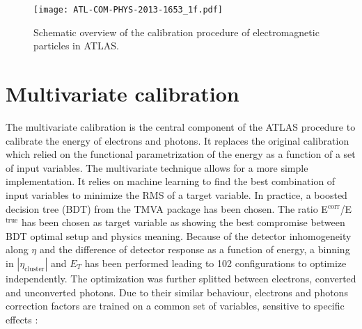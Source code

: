 \begin{figure}[htbp]
\centering
\texttt{[image: ATL-COM-PHYS-2013-1653\_1f.pdf]}
\caption{\label{fig:orgfcfa421}
Schematic overview of the calibration procedure of electromagnetic particles in ATLAS.\cite{CERN-PH-EP-2014-153}}
\end{figure}


\section{Multivariate calibration}
\label{sec:org8232c38}

The multivariate calibration \cite{CERN-PH-EP-2014-153,ATL-COM-PHYS-2013-1426,ATL-COM-PHYS-2017-761} is the central component of the ATLAS procedure to calibrate the energy of electrons and photons.
It replaces the original calibration \cite{ATL-LARG-PUB-2007-012} which relied on the functional parametrization of the energy as a function of a set of input variables.
The multivariate technique allows for a more simple implementation.
It relies on machine learning to find the best combination of input variables to minimize the RMS of a target variable.
In practice, a boosted decision tree (BDT) from the TMVA package \cite{physics/0703039,CERN-OPEN-2007-007} has been chosen.
The ratio E\(^{\text{corr}}\)/E\(^{\text{true}}\) has been chosen as target variable as showing the best compromise between BDT optimal setup and physics meaning.
Because of the detector inhomogeneity along $\eta$ and the difference of detector response as a function of energy, a binning in $|\eta_\text{cluster}|$ and $E_T$ has been performed leading to 102 configurations to optimize independently.
The optimization was further splitted between electrons, converted and unconverted photons.
Due to their similar behaviour, electrons and photons correction factors are trained on a common set of variables, sensitive to specific effects :

